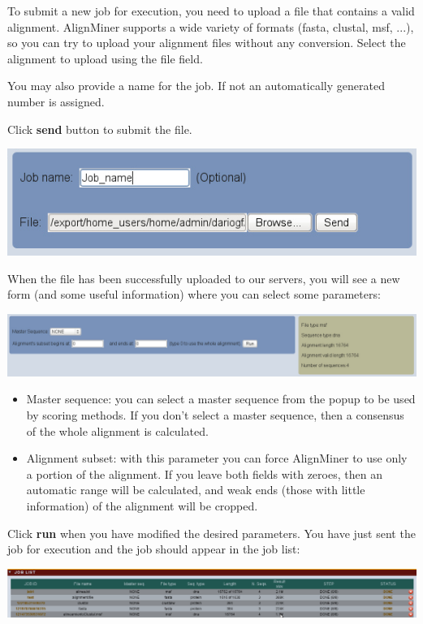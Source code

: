 \documentclass[12pt,oneside,a4paper,english]{article}  %
\begin{document}
To submit a new job for execution, you need to upload a file that contains a valid alignment. AlignMiner supports a wide variety of formats (fasta, clustal, msf, ...), so you can try to upload your alignment files without any conversion. Select the alignment to upload using the file field.

You may also provide a name for the job. If not an automatically generated number is assigned.

Click \textbf{send} button to submit the file.

\begin{center}
		\includegraphics[width=.6\linewidth]{pics/submit.jpg}
\end{center}

When the file has been successfully uploaded to our servers, you will see a new form (and some useful information) where you can select some parameters:

\begin{center}
		\includegraphics[width=\linewidth]{pics/params.jpg}
\end{center}

\begin{itemize}
\item Master sequence: you can select a master sequence from the popup to be used by scoring methods. If you don't select a master sequence, then a consensus of the whole alignment is calculated.
\item Alignment subset: with this parameter you can force AlignMiner to use only a portion of the alignment. If you leave both fields with zeroes, then an automatic range will be calculated, and weak ends (those with little information) of the alignment will be cropped.
\end{itemize}

Click \textbf{run} when you have modified the desired parameters. You have just sent the job for execution and the job should appear in the job list:

\begin{center}
		\includegraphics[width=\linewidth]{pics/joblist.jpg}
\end{center}
\end{document}
